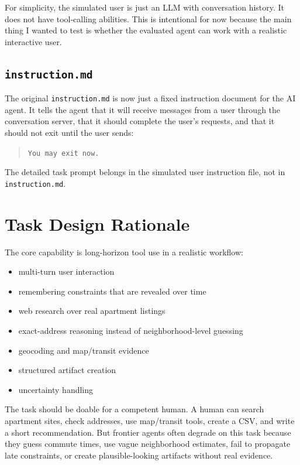 \documentclass[11pt]{article}
\begin{document}
For simplicity, the simulated user is just an LLM with conversation history. It
does not have tool-calling abilities. This is intentional for now because the
main thing I wanted to test is whether the evaluated agent can work with a
realistic interactive user.

\subsection{\texttt{instruction.md}}

The original \texttt{instruction.md} is now just a fixed instruction document
for the AI agent. It tells the agent that it will receive messages from a user
through the conversation server, that it should complete the user's requests,
and that it should not exit until the user sends:

\begin{quote}
\texttt{You may exit now.}
\end{quote}

The detailed task prompt belongs in the simulated user instruction file, not in
\texttt{instruction.md}.

\section{Task Design Rationale}

The core capability is long-horizon tool use in a realistic workflow:

\begin{itemize}
  \item multi-turn user interaction
  \item remembering constraints that are revealed over time
  \item web research over real apartment listings
  \item exact-address reasoning instead of neighborhood-level guessing
  \item geocoding and map/transit evidence
  \item structured artifact creation
  \item uncertainty handling
\end{itemize}

The task should be doable for a competent human. A human can search apartment
sites, check addresses, use map/transit tools, create a CSV, and write a short
recommendation. But frontier agents often degrade on this task because they
guess commute times, use vague neighborhood estimates, fail to propagate late
constraints, or create plausible-looking artifacts without real evidence.
\end{document}
